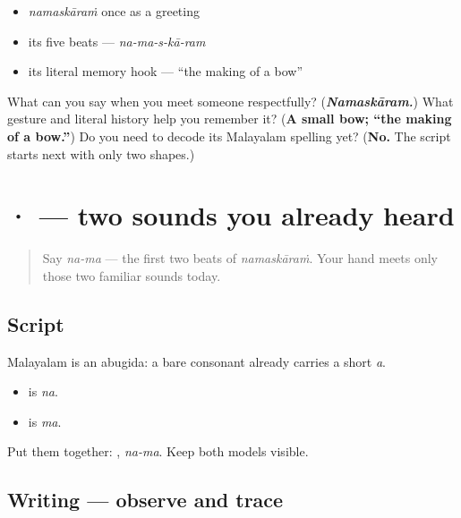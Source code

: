 \begin{itemize}
\raggedright
  \item \emph{namaskāraṁ} once as a greeting
  \item its five beats — \emph{na-ma-s-kā-ram}
  \item its literal memory hook — “the making of a bow”
\end{itemize}

\begin{tcolorbox}[breakable,colback=teal!4,colframe=teal!35!black,title={Before you move on}]
What can you say when you meet someone respectfully? (\emph{\textbf{Namaskāram.}}) What gesture and literal history help you remember it? (\textbf{A small bow; “the making of a bow.”}) Do you need to decode its Malayalam spelling yet? (\textbf{No.} The script starts next with only two shapes.)
\end{tcolorbox}
\section[\texorpdfstring{\ml{ന} \ml{മ} (na ma)}{ന മ (na ma)}]{ ·  — two sounds you already heard}

\label{lesson:ML-W01-na-ma-trace}



\begin{quote}
Say \emph{na-ma} — the first two beats of \emph{namaskāraṁ}. Your hand meets only those two familiar sounds today.
\end{quote}

\subsection*{Script}
Malayalam is an abugida: a bare consonant already carries a short \emph{a}.

\begin{itemize}
\raggedright
  \item \textbf{} is \emph{na}.
  \item \textbf{} is \emph{ma}.
\end{itemize}

Put them together: \textbf{}, \emph{na-ma}. Keep both models visible.

\subsection*{Writing — observe and trace}

